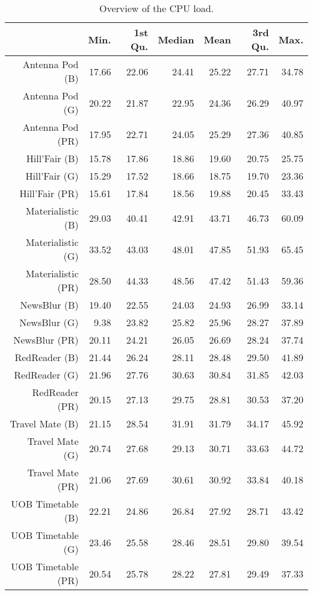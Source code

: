 \begin{table}[ht]
\centering
\begin{tabular}{rrrrrrr}
  \hline
 & Min. & 1st Qu. & Median & Mean & 3rd Qu. & Max. \\ 
  \hline
Antenna Pod (B) & 17.66 & 22.06 & 24.41 & 25.22 & 27.71 & 34.78 \\ 
  Antenna Pod (G) & 20.22 & 21.87 & 22.95 & 24.36 & 26.29 & 40.97 \\ 
  Antenna Pod (PR) & 17.95 & 22.71 & 24.05 & 25.29 & 27.36 & 40.85 \\ 
  Hill'Fair (B) & 15.78 & 17.86 & 18.86 & 19.60 & 20.75 & 25.75 \\ 
  Hill'Fair (G) & 15.29 & 17.52 & 18.66 & 18.75 & 19.70 & 23.36 \\ 
  Hill'Fair (PR) & 15.61 & 17.84 & 18.56 & 19.88 & 20.45 & 33.43 \\ 
  Materialistic (B) & 29.03 & 40.41 & 42.91 & 43.71 & 46.73 & 60.09 \\ 
  Materialistic (G) & 33.52 & 43.03 & 48.01 & 47.85 & 51.93 & 65.45 \\ 
  Materialistic (PR) & 28.50 & 44.33 & 48.56 & 47.42 & 51.43 & 59.36 \\ 
  NewsBlur (B) & 19.40 & 22.55 & 24.03 & 24.93 & 26.99 & 33.14 \\ 
  NewsBlur (G) & 9.38 & 23.82 & 25.82 & 25.96 & 28.27 & 37.89 \\ 
  NewsBlur (PR) & 20.11 & 24.21 & 26.05 & 26.69 & 28.24 & 37.74 \\ 
  RedReader (B) & 21.44 & 26.24 & 28.11 & 28.48 & 29.50 & 41.89 \\ 
  RedReader (G) & 21.96 & 27.76 & 30.63 & 30.84 & 31.85 & 42.03 \\ 
  RedReader (PR) & 20.15 & 27.13 & 29.75 & 28.81 & 30.53 & 37.20 \\ 
  Travel Mate (B) & 21.15 & 28.54 & 31.91 & 31.79 & 34.17 & 45.92 \\ 
  Travel Mate (G) & 20.74 & 27.68 & 29.13 & 30.71 & 33.63 & 44.72 \\ 
  Travel Mate (PR) & 21.06 & 27.69 & 30.61 & 30.92 & 33.84 & 40.18 \\ 
  UOB Timetable (B) & 22.21 & 24.86 & 26.84 & 27.92 & 28.71 & 43.42 \\ 
  UOB Timetable (G) & 23.46 & 25.58 & 28.46 & 28.51 & 29.80 & 39.54 \\ 
  UOB Timetable (PR) & 20.54 & 25.78 & 28.22 & 27.81 & 29.49 & 37.33 \\ 
   \hline
\end{tabular}
\caption{Overview of the CPU load.} 
\label{tab:results:rq1:summary:cpu}
\end{table}
